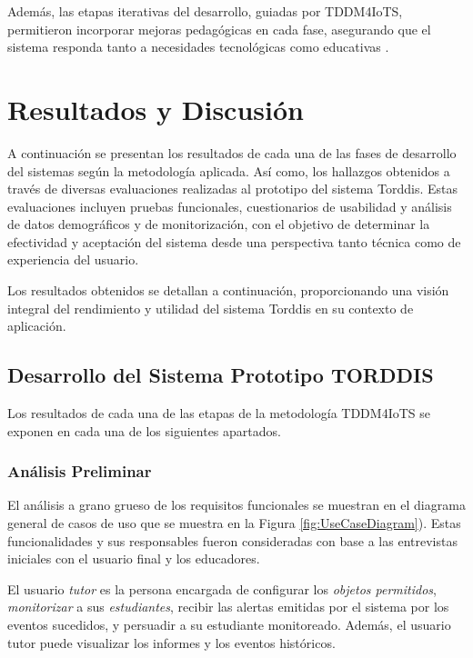 			Además, las etapas iterativas del desarrollo, guiadas por TDDM4IoTS, permitieron incorporar mejoras pedagógicas en cada fase, asegurando que el sistema responda tanto a necesidades tecnológicas como educativas \citep{Huang2025How}.
			
	\section{Resultados y Discusión}
	\label{seccion:Cinco}
		A continuación se presentan los resultados de cada una de las fases de desarrollo del sistemas según la metodología aplicada. Así como, los hallazgos obtenidos a través de diversas evaluaciones realizadas al prototipo del sistema Torddis. Estas evaluaciones incluyen pruebas funcionales, cuestionarios de usabilidad y análisis de datos demográficos y de monitorización, con el objetivo de determinar la efectividad y aceptación del sistema desde una perspectiva tanto técnica como de experiencia del usuario.
		
		Los resultados obtenidos se detallan a continuación, proporcionando una visión integral del rendimiento y utilidad del sistema Torddis en su contexto de aplicación.
		
		\subsection{Desarrollo del Sistema Prototipo TORDDIS}
			Los resultados de cada una de las etapas de la metodología TDDM4IoTS \citep{Guerrero-Ulloa2020TDDM4IoTS} se exponen en cada una de los siguientes apartados.
			
			\subsubsection{Análisis Preliminar}
				El análisis a grano grueso de los requisitos funcionales se muestran en el diagrama general de casos de uso que se muestra en la Figura \ref{fig:UseCaseDiagram}). Estas funcionalidades y sus responsables fueron consideradas con base a las entrevistas iniciales con el usuario final y los educadores.
				
				El usuario \textit{tutor} es la persona encargada de configurar los \textit{objetos permitidos}, \textit{monitorizar} a sus \textit{estudiantes}, recibir las alertas emitidas por el sistema por los eventos sucedidos, y persuadir a su estudiante monitoreado. Además, el usuario tutor puede visualizar los informes y los eventos históricos.
				
